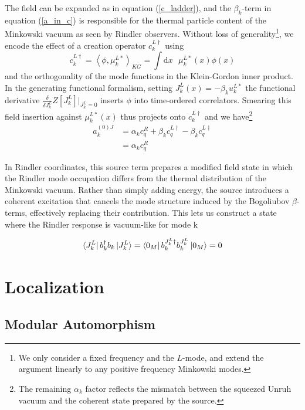 \documentclass[12pt,a4paper]{article}
\newcommand{\dv}[1]{\mathrm{d} #1 \text{ }}
\begin{document}
The field can be expanded as in equation (\ref{c_ladder}), and the $\beta_k$-term in equation (\ref{a_in_c}) is responsible for the thermal particle content of the Minkowski vacuum as seen by Rindler observers. Without loss of generality\footnote{We only consider a fixed frequency and the $L$-mode, and extend the argument linearly to any positive frequency Minkowski modes.}, we encode the effect of a creation operator $c_k^{L \dagger}$ using
\begin{equation}
  c _k^{L\dagger} = \left<\phi, \mu_k^{L*}\right>_{KG} = \int \dv{x} \mu_k^{L*}(x) \phi(x)
\end{equation}
and the orthogonality of the mode functions in the Klein-Gordon inner product. In the generating functional formalism, setting $J_k^L(x) = -\beta_k u_k^{L*}$ the functional derivative $\frac{\delta}{\delta J_k^L}Z[J_k^L]|_{J_k^L=0}$ inserts $\phi$ into time-ordered correlators. Smearing this field insertion against $\mu_k^{L*}(x)$ thus projects onto $c_k^{L\dagger}$ and we have\footnote{The remaining $\alpha_k$ factor reflects the mismatch between the squeezed Unruh vacuum and the coherent state prepared by the source.}
\begin{equation}
\begin{array}{ll}
  a_k^{(0)J} &= \alpha_k c_q^R + \beta_k c_q^{L\dagger} -  \beta_k c_q^{L\dagger} \\
  &= \alpha_k c_q^R
\end{array}
\end{equation}

In Rindler coordinates, this source term prepares a modified field state in which the Rindler mode occupation differs from the thermal distribution of the Minkowski vacuum. Rather than simply adding energy, the source introduces a coherent excitation that cancels the mode structure induced by the Bogoliubov $\beta$-terms, effectively replacing their contribution. This lets us construct a state where the Rindler response is vacuum-like for mode k

\begin{equation}
  \bra{J_k^L}  b_k^{\dagger} b_k \ket{J_k^L} = \bra{0_M}  b_k^{J_k^L \dagger} b^{J_k^L}_k \ket{0_M} = 0
\end{equation}

\section{Localization}
\subsection{Modular Automorphism}
\end{document}
